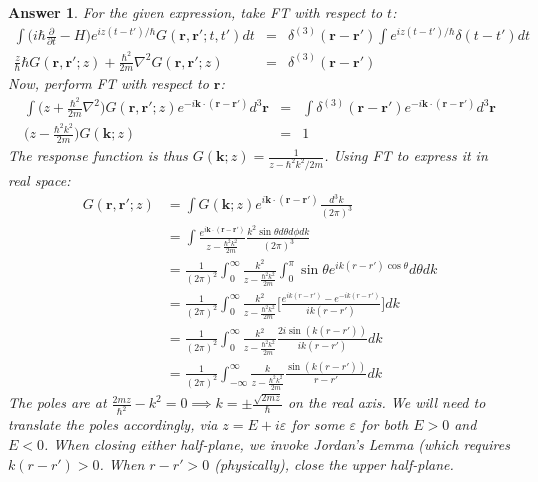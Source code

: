 \documentclass[a4paper]{article}
\newtheorem{ans}{Answer}[section]
\theoremstyle{new}
\begin{document}
\begin{ans}
For the given expression, take FT with respect to $t$:
\begin{eqnarray}
\int\bigg(i\hbar\frac{\partial}{\partial t}-H\bigg)e^{iz(t-t')/\hbar}G(\mathbf{r},\mathbf{r'};t,t')dt&=&\delta^{(3)}(\mathbf{r}-\mathbf{r'})\int e^{iz(t-t')/\hbar}\delta(t-t')dt\nonumber\\
\frac{z}{\hbar}\hbar G(\mathbf{r},\mathbf{r'};z)+\frac{\hbar^2}{2m}\nabla^2G(\mathbf{r},\mathbf{r'};z)&=&\delta^{(3)}(\mathbf{r}-\mathbf{r'})\nonumber
\end{eqnarray}
Now, perform FT with respect to $\mathbf{r}$:
\begin{eqnarray}
\int\bigg(z+\frac{\hbar^2}{2m}\nabla^2\bigg)G(\mathbf{r},\mathbf{r'};z)e^{-i\mathbf{k}\cdot(\mathbf{r}-\mathbf{r'})}d^3\mathbf{r}&=&\int\delta^{(3)}(\mathbf{r}-\mathbf{r'})e^{-i\mathbf{k}\cdot(\mathbf{r}-\mathbf{r'})}d^3\mathbf{r}\nonumber\\\bigg(z-\frac{\hbar^2k^2}{2m}\bigg)G(\mathbf{k};z)&=&1\nonumber
\end{eqnarray}
The response function is thus $G(\mathbf{k};z)=\frac{1}{z-\hbar^2k^2/2m}$. Using FT to express it in real space:
\begin{align}
    G(\mathbf{r},\mathbf{r'};z)&=\int G(\mathbf{k};z)e^{i\mathbf{k}\cdot(\mathbf{r}-\mathbf{r'})}\frac{d^3k}{(2\pi)^3}\nonumber\\&=\int\frac{e^{i\mathbf{k}\cdot(\mathbf{r}-\mathbf{r'})}}{z-\frac{\hbar^2k^2}{2m}}\frac{k^2\sin\theta d\theta d\phi dk}{(2\pi)^3}\nonumber\\&=\frac{1}{(2\pi)^2}\int_0^\infty\frac{k^2}{z-\frac{\hbar^2k^2}{2m}}\int_0^\pi\sin\theta e^{ik(r-r')\cos\theta}d\theta dk\nonumber\\&=\frac{1}{(2\pi)^2}\int_0^\infty\frac{k^2}{z-\frac{\hbar^2k^2}{2m}}\bigg[\frac{e^{ik(r-r')}-e^{-ik(r-r')}}{ik(r-r')}\bigg]dk\nonumber\\&=\frac{1}{(2\pi)^2}\int_0^\infty\frac{k^2}{z-\frac{\hbar^2k^2}{2m}}\frac{2i\sin(k(r-r'))}{ik(r-r')}dk\nonumber\\&=\frac{1}{(2\pi)^2}\int_{-\infty}^\infty\frac{k}{z-\frac{\hbar^2k^2}{2m}}\frac{\sin(k(r-r'))}{r-r'}dk\nonumber
\end{align}
The poles are at $\frac{2mz}{\hbar^2}-k^2=0\implies k=\pm\frac{\sqrt{2mz}}{\hbar}$ on the real axis. We will need to translate the poles accordingly, via $z=E+i\varepsilon$ for some $\varepsilon$ for both $E>0$ and $E<0$. When closing either half-plane, we invoke Jordan's Lemma (which requires $k(r-r')>0$. When $r-r'>0$ (physically), close the upper half-plane.

\end{ans}
\end{document}
